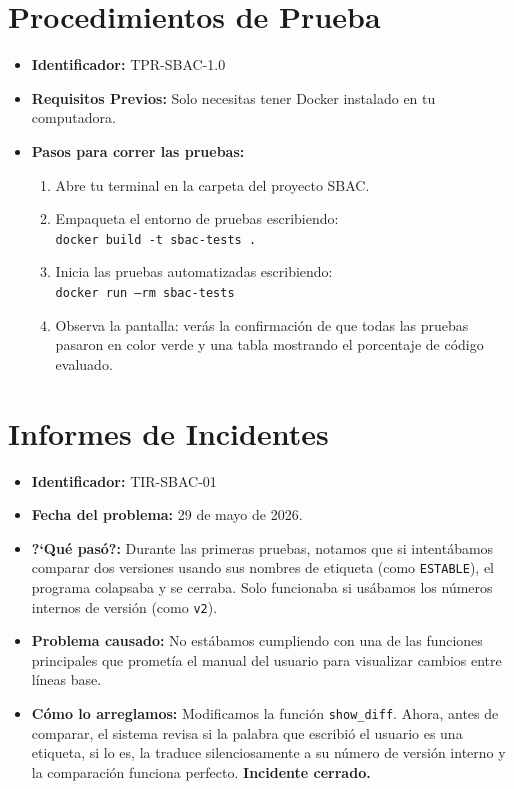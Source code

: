 \documentclass[12pt, letterpaper]{article}
\begin{document}
\section{Procedimientos de Prueba}
\begin{itemize}[leftmargin=*]
    \item \textbf{Identificador:} TPR-SBAC-1.0
    \item \textbf{Requisitos Previos:} Solo necesitas tener Docker instalado en tu computadora.
    \item \textbf{Pasos para correr las pruebas:}
    \begin{enumerate}
        \item Abre tu terminal en la carpeta del proyecto SBAC.
        \item Empaqueta el entorno de pruebas escribiendo: \\ \texttt{docker build -t sbac-tests .}
        \item Inicia las pruebas automatizadas escribiendo: \\ \texttt{docker run --rm sbac-tests}
        \item Observa la pantalla: verás la confirmación de que todas las pruebas pasaron en color verde y una tabla mostrando el porcentaje de código evaluado.
    \end{enumerate}
\end{itemize}

\section{Informes de Incidentes}
\begin{itemize}[leftmargin=*]
    \item \textbf{Identificador:} TIR-SBAC-01
    \item \textbf{Fecha del problema:} 29 de mayo de 2026.
    \item \textbf{?`Qué pasó?:} Durante las primeras pruebas, notamos que si intentábamos comparar dos versiones usando sus nombres de etiqueta (como \texttt{ESTABLE}), el programa colapsaba y se cerraba. Solo funcionaba si usábamos los números internos de versión (como \texttt{v2}).
    \item \textbf{Problema causado:} No estábamos cumpliendo con una de las funciones principales que prometía el manual del usuario para visualizar cambios entre líneas base.
    \item \textbf{Cómo lo arreglamos:} Modificamos la función \texttt{show\_diff}. Ahora, antes de comparar, el sistema revisa si la palabra que escribió el usuario es una etiqueta, si lo es, la traduce silenciosamente a su número de versión interno y la comparación funciona perfecto. \textbf{Incidente cerrado.}
\end{itemize}
\end{document}
